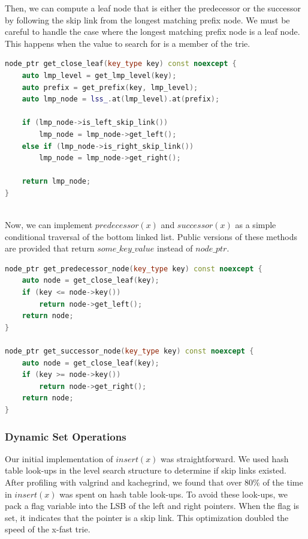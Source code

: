 \documentclass{article}
\begin{document}
\noindent
Then, we can compute a leaf node that is either the predecessor or the successor by following the skip link from the longest matching prefix node. We must be careful to handle the case where the longest matching prefix node is a leaf node. This happens when the value to search for is a member of the trie.

\begin{lstlisting}[language=C++,basicstyle=\small]
node_ptr get_close_leaf(key_type key) const noexcept {
	auto lmp_level = get_lmp_level(key);
	auto prefix = get_prefix(key, lmp_level);
	auto lmp_node = lss_.at(lmp_level).at(prefix);

	if (lmp_node->is_left_skip_link())
		lmp_node = lmp_node->get_left();
	else if (lmp_node->is_right_skip_link())
		lmp_node = lmp_node->get_right();
	
	return lmp_node;
}
\end{lstlisting}

\noindent
 \\ Now, we can implement $predecessor(x)$ and $successor(x)$ as a simple conditional traversal of the bottom linked list. Public versions of these methods are provided that return $some\_key\_value$ instead of $node\_ptr$.

\begin{lstlisting}[language=C++,basicstyle=\small]
node_ptr get_predecessor_node(key_type key) const noexcept {
	auto node = get_close_leaf(key);
	if (key <= node->key())
		return node->get_left();
	return node;
}

node_ptr get_successor_node(key_type key) const noexcept {
	auto node = get_close_leaf(key);
	if (key >= node->key())
		return node->get_right();
	return node;
}
\end{lstlisting}

\subsubsection{Dynamic Set Operations}
Our initial implementation of $insert(x)$ was straightforward. We used hash table look-ups in the level search structure to determine if skip links existed. After profiling with valgrind and kachegrind, we found that over $80\%$ of the time in $insert(x)$ was spent on hash table look-ups. To avoid these look-ups, we pack a flag variable into the LSB of the left and right pointers. When the flag is set, it indicates that the pointer is a skip link. This optimization doubled the speed of the x-fast trie. 
\\
\end{document}
